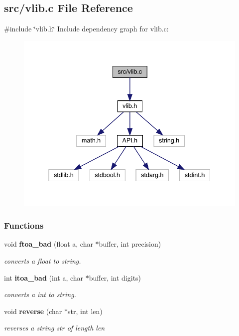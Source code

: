 \subsection{src/vlib.c File Reference}
\label{vlib_8c}
{\ttfamily \#include \char`\"{}vlib.\+h\char`\"{}}\newline
Include dependency graph for vlib.\+c\+:\nopagebreak
\begin{figure}[H]
\begin{center}
\leavevmode
\includegraphics[width=338pt]{vlib_8c__incl}
\end{center}
\end{figure}
\subsubsection*{Functions}
\begin{DoxyCompactItemize}
\item 
void \textbf{ ftoa\+\_\+bad} (float a, char $\ast$buffer, int precision)
\begin{DoxyCompactList}\small\item\em converts a float to string. \end{DoxyCompactList}\item 
int \textbf{ itoa\+\_\+bad} (int a, char $\ast$buffer, int digits)
\begin{DoxyCompactList}\small\item\em converts a int to string. \end{DoxyCompactList}\item 
void \textbf{ reverse} (char $\ast$str, int len)
\begin{DoxyCompactList}\small\item\em reverses a string \textquotesingle{}str\textquotesingle{} of length \textquotesingle{}len\textquotesingle{} \end{DoxyCompactList}\end{DoxyCompactItemize}


